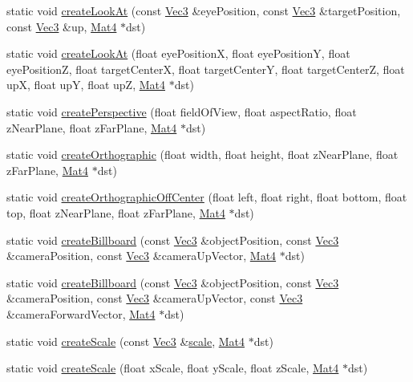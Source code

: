 \begin{DoxyCompactItemize}
\item 
static void \hyperlink{classMat4_a8991dfd7f1ce7d7450da6990305a4bce}{create\+Look\+At} (const \hyperlink{classVec3}{Vec3} \&eye\+Position, const \hyperlink{classVec3}{Vec3} \&target\+Position, const \hyperlink{classVec3}{Vec3} \&up, \hyperlink{classMat4}{Mat4} $\ast$dst)
\item 
static void \hyperlink{classMat4_aa8b3320f1510835c4c59a4f7abb31bf7}{create\+Look\+At} (float eye\+PositionX, float eye\+PositionY, float eye\+PositionZ, float target\+CenterX, float target\+CenterY, float target\+CenterZ, float upX, float upY, float upZ, \hyperlink{classMat4}{Mat4} $\ast$dst)
\item 
static void \hyperlink{classMat4_a4ec1ce3e6b37e7c9b5833f7644d006e0}{create\+Perspective} (float field\+Of\+View, float aspect\+Ratio, float z\+Near\+Plane, float z\+Far\+Plane, \hyperlink{classMat4}{Mat4} $\ast$dst)
\item 
static void \hyperlink{classMat4_a3379c9732b8939ac485d06050a4b90c5}{create\+Orthographic} (float width, float height, float z\+Near\+Plane, float z\+Far\+Plane, \hyperlink{classMat4}{Mat4} $\ast$dst)
\item 
static void \hyperlink{classMat4_a3a6f855340247fb96a16ca0a5b85dea7}{create\+Orthographic\+Off\+Center} (float left, float right, float bottom, float top, float z\+Near\+Plane, float z\+Far\+Plane, \hyperlink{classMat4}{Mat4} $\ast$dst)
\item 
static void \hyperlink{classMat4_ac8c862642a20d5d6c980a487cdfc2dcb}{create\+Billboard} (const \hyperlink{classVec3}{Vec3} \&object\+Position, const \hyperlink{classVec3}{Vec3} \&camera\+Position, const \hyperlink{classVec3}{Vec3} \&camera\+Up\+Vector, \hyperlink{classMat4}{Mat4} $\ast$dst)
\item 
static void \hyperlink{classMat4_aa58fc226b281d27e66d6ec24798aa136}{create\+Billboard} (const \hyperlink{classVec3}{Vec3} \&object\+Position, const \hyperlink{classVec3}{Vec3} \&camera\+Position, const \hyperlink{classVec3}{Vec3} \&camera\+Up\+Vector, const \hyperlink{classVec3}{Vec3} \&camera\+Forward\+Vector, \hyperlink{classMat4}{Mat4} $\ast$dst)
\item 
static void \hyperlink{classMat4_a0cb022e5faa5956fbbade37e82210518}{create\+Scale} (const \hyperlink{classVec3}{Vec3} \&\hyperlink{classMat4_a37c910140d6378e4ef7c7bb1e2d0296d}{scale}, \hyperlink{classMat4}{Mat4} $\ast$dst)
\item 
static void \hyperlink{classMat4_a198c75115c8c4c9fc9dca2ae39406ae8}{create\+Scale} (float x\+Scale, float y\+Scale, float z\+Scale, \hyperlink{classMat4}{Mat4} $\ast$dst)

\end{DoxyCompactItemize}
